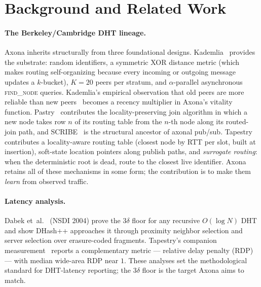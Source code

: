\documentclass[conference]{IEEEtran}
\newcommand{\axona}{Axona\xspace}
\begin{document}
\section{Background and Related Work}
\label{sec:related}

\paragraph{The Berkeley/Cambridge DHT lineage.}
\axona inherits structurally from three foundational designs.
Kademlia~\cite{maymounkov2002kademlia} provides the substrate:
random identifiers, a symmetric XOR distance metric (which
makes routing self-organizing because every incoming or outgoing
message updates a $k$-bucket), $K=20$ peers per stratum, and
$\alpha$-parallel asynchronous \textsc{find\_node} queries.
Kademlia's empirical observation that old peers are more reliable
than new peers~\cite{saroiu2003measurement} becomes a recency
multiplier in \axona's vitality function.
Pastry~\cite{rowstron2001pastry} contributes the
locality-preserving join algorithm in which a new node takes row
$n$ of its routing table from the $n$-th node along its
routed-join path, and SCRIBE~\cite{castro2002scribe} is the
structural ancestor of axonal pub/sub.
Tapestry~\cite{zhao2004tapestry} contributes a locality-aware
routing table (closest node by RTT per slot, built at insertion),
soft-state location pointers along publish paths, and
\emph{surrogate routing}: when the deterministic root is dead,
route to the closest live identifier.  \axona retains all of
these mechanisms in some form; the contribution is to make them
\emph{learn} from observed traffic.

\paragraph{Latency analysis.}
Dabek et~al.~\cite{dabek2004designing} (NSDI 2004) prove the
$3\delta$ floor for any recursive $O(\log N)$ DHT and show
DHash++ approaches it through proximity neighbor selection and
server selection over erasure-coded fragments.  Tapestry's
companion measurement~\cite{zhao2004tapestry} reports a
complementary metric --- relative delay penalty (RDP) --- with
median wide-area RDP near $1$.  These analyses set the
methodological standard for DHT-latency reporting; the
$3\delta$ floor is the target \axona aims to match.
\end{document}
